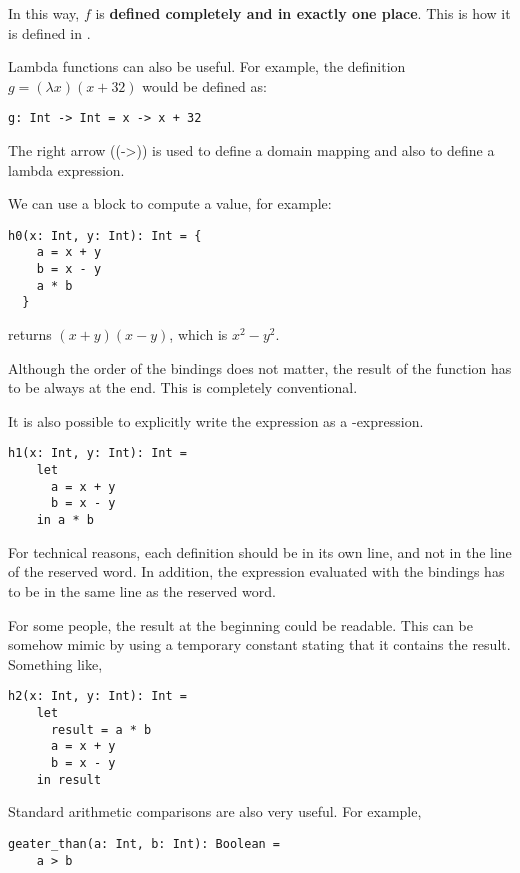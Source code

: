 In this way, $f$ is \textbf{defined completely and in exactly one place}.
This is how it is defined in \Soda.

Lambda functions can also be useful.
For example, the definition
$g = (\lambda x)(x + 32)$
would be defined as:
\begin{lstlisting}[label={lst:exampleFunctionDefinitionWithLambda}]
  g: Int -> Int = x -> x + 32
\end{lstlisting}

The right arrow (\srccode(->)) is used to define a domain mapping and also to define a lambda expression.


We can use a block to compute a value, for example:
\begin{lstlisting}[label={lst:exampleFunctionDefinitionWithBraces}]
  h0(x: Int, y: Int): Int = {
    a = x + y
    b = x - y
    a * b
  }
\end{lstlisting}
returns $(x + y)(x - y)$, which is $x^{2} - y^{2}$.

Although the order of the bindings does not matter, the result of the function has to be always at the end.
This is completely conventional.

It is also possible to explicitly write the expression as a \slet-\sdin expression.
\begin{lstlisting}[label={lst:exampleFunctionDefinitionWithLetIn}]
  h1(x: Int, y: Int): Int =
    let
      a = x + y
      b = x - y
    in a * b
\end{lstlisting}

For technical reasons, each definition should be in its own line, and not in the line of the \slet reserved word.
In addition, the expression evaluated with the bindings has to be in the same line as the \sdin reserved word.

For some people, the result at the beginning could be readable.
This can be somehow mimic by using a temporary constant stating that it contains the result.
Something like,
\begin{lstlisting}[label={lst:exampleFunctionDefinitionWithBlockAndResult}]
  h2(x: Int, y: Int): Int =
    let
      result = a * b
      a = x + y
      b = x - y
    in result
\end{lstlisting}

Standard arithmetic comparisons are also very useful.
For example,
\begin{lstlisting}[label={lst:exampleComparison}]
  geater_than(a: Int, b: Int): Boolean =
    a > b
\end{lstlisting}

